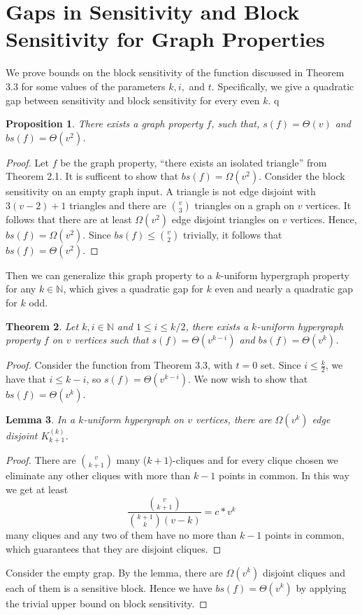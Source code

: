 \documentclass[psamsfonts]{amsart}
\newtheorem{theorem}{Theorem}[section]
\newtheorem{prop}[theorem]{Proposition}
\newtheorem{lem}[theorem]{Lemma}
\theoremstyle{definition}
\theoremstyle{remark}
\numberwithin{equation}{section}
\begin{document}
\section{Gaps in Sensitivity and Block Sensitivity for Graph Properties}
	We prove bounds on the block sensitivity of the function discussed in Theorem 3.3 for some values of the parameters $k,i,$ and $t$. Specifically, we give a quadratic gap between sensitivity and block sensitivity for every even $k$.
q
	\begin{prop}
		There exists a graph property $f$, such that, $s(f) = \Theta(v)$ and $bs(f) = \Theta(v^2)$.
	\end{prop} 
	\begin{proof}
		Let $f$ be the graph property, ``there exists an isolated triangle'' from Theorem 2.1. It is sufficent to show that $bs(f)=\Omega(v^2)$. Consider the block sensitivity on an empty graph input. A triangle is not edge disjoint with $3(v-2)+1$ triangles and there are ${v \choose 3}$ triangles on a graph on $v$ vertices. It follows that there are at least $\Omega(v^2)$ edge disjoint triangles on $v$ vertices. Hence, $bs(f) = \Omega(v^2)$. Since $bs(f) \leq {v \choose 2}$ trivially, it follows that $bs(f) = \Theta(v^2)$.
	\end{proof}

	Then we can generalize this graph property to a $k$-uniform hypergraph property for any $k \in \mathbb{N}$, which gives a quadratic gap for $k$ even and nearly a quadratic gap for $k$ odd.
	\begin{theorem}
		Let $k,i \in \mathbb{N}$ and $1 \leq i \leq k/2$, there exists a $k$-uniform hypergraph property $f$ on $v$ vertices such that $s(f) = \Theta(v^{k-i})$ and $bs(f) = \Theta(v^{k})$.
	\end{theorem}
	\begin{proof}
		Consider the function from Theorem 3.3, with $t=0$ set. Since $i\leq\frac{k}{2}$, we have that $i\leq k-i$, so $s(f)=\Theta(v^{k-i})$. We now wish to show that $bs(f)=\Theta(v^k)$.
		\begin{lem}
			In a $k$-uniform hypergraph on $v$ vertices, there are $\Omega (v^k)$ edge disjoint $K_{k+1}^{(k)}$.
		\end{lem}
		\begin{proof}
			There are $v \choose{k+1}$  many ($k+1$)-cliques and for every clique chosen we eliminate any other cliques with more than $k-1$ points in common. In this way we get at least
		\begin{equation}
			\frac{{v \choose{k+1}}}{{k+1 \choose{k}}(v-k)} = c*v^{k} \nonumber
		\end{equation}		 
		many cliques and any two of them have no more than $k-1$ points in common, which guarantees that they are disjoint cliques.
		\end{proof}
		Consider the empty grap. By the lemma, there are $\Omega (v^k)$ disjoint cliques and each of them is a sensitive block. Hence we have $bs(f) = \Theta (v^k)$ by applying the trivial upper bound on block sensitivity.
	\end{proof}
	
\end{document}
